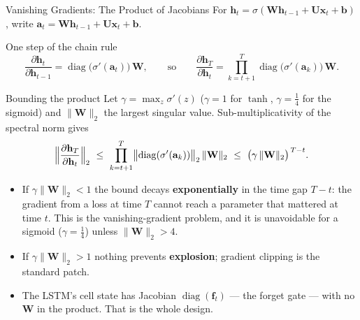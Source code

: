 \documentclass[notes,11pt, aspectratio=169]{beamer}
\begin{document}
\begin{frame}{Vanishing Gradients: The Product of Jacobians}\footnotesize
For $\mathbf{h}_t=\sigma(\mathbf{W}\mathbf{h}_{t-1}+\mathbf{U}\mathbf{x}_t+\mathbf{b})$, write $\mathbf{a}_t=\mathbf{W}\mathbf{h}_{t-1}+\mathbf{U}\mathbf{x}_t+\mathbf{b}$.
\begin{block}{One step of the chain rule}
\[
\frac{\partial\mathbf{h}_t}{\partial\mathbf{h}_{t-1}}=\operatorname{diag}\!\bigl(\sigma'(\mathbf{a}_t)\bigr)\,\mathbf{W},
\qquad\text{so}\qquad
\frac{\partial\mathbf{h}_T}{\partial\mathbf{h}_t}=\prod_{k=t+1}^{T}\operatorname{diag}\!\bigl(\sigma'(\mathbf{a}_k)\bigr)\,\mathbf{W}.
\]
\end{block}
\begin{block}{Bounding the product}
Let $\gamma=\max_z\sigma'(z)$ ($\gamma=1$ for $\tanh$, $\gamma=\tfrac14$ for the sigmoid) and $\|\mathbf{W}\|_2$ the largest singular value. Sub-multiplicativity of the spectral norm gives
\[
\Bigl\|\frac{\partial\mathbf{h}_T}{\partial\mathbf{h}_t}\Bigr\|_2\ \le\ \prod_{k=t+1}^{T}\bigl\|\operatorname{diag}(\sigma'(\mathbf{a}_k))\bigr\|_2\,\|\mathbf{W}\|_2\ \le\ \bigl(\gamma\,\|\mathbf{W}\|_2\bigr)^{\,T-t}.
\]
\end{block}
\begin{itemize}
  \item If $\gamma\|\mathbf{W}\|_2<1$ the bound decays \textbf{exponentially} in the time gap $T-t$: the gradient from a loss at time $T$ cannot reach a parameter that mattered at time $t$. This is the vanishing-gradient problem, and it is unavoidable for a sigmoid ($\gamma=\tfrac14$) unless $\|\mathbf{W}\|_2>4$.
  \item If $\gamma\|\mathbf{W}\|_2>1$ nothing prevents \textbf{explosion}; gradient clipping is the standard patch.
  \item The LSTM's cell state has Jacobian $\operatorname{diag}(\mathbf{f}_t)$ --- the forget gate --- with no $\mathbf{W}$ in the product. That is the whole design.
\end{itemize}
\end{frame}
\end{document}

